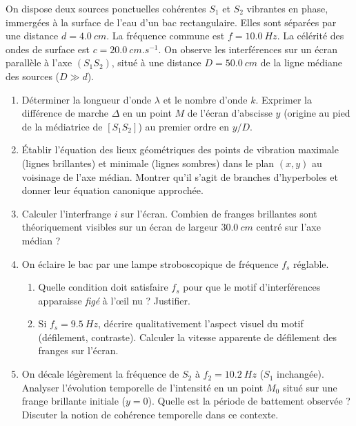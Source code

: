 \documentclass[11pt]{article}
\begin{document}
\begin{exercice}
On dispose deux sources ponctuelles cohérentes $S_1$ et $S_2$ vibrantes en phase, immergées à la surface de l'eau d'un bac rectangulaire. Elles sont séparées par une distance $d = \SI{4,0}{cm}$. La fréquence commune est $f = \SI{10,0}{Hz}$. La célérité des ondes de surface est $c = \SI{20,0}{cm.s^{-1}}$. On observe les interférences sur un écran parallèle à l'axe $(S_1S_2)$, situé à une distance $D = \SI{50,0}{cm}$ de la ligne médiane des sources ($D \gg d$).
\begin{enumerate}
    \item Déterminer la longueur d'onde $\lambda$ et le nombre d'onde $k$. Exprimer la différence de marche $\Delta$ en un point $M$ de l'écran d'abscisse $y$ (origine au pied de la médiatrice de $[S_1S_2]$) au premier ordre en $y/D$.
    \item Établir l'équation des lieux géométriques des points de vibration maximale (lignes brillantes) et minimale (lignes sombres) dans le plan $(x,y)$ au voisinage de l'axe médian. Montrer qu'il s'agit de branches d'hyperboles et donner leur équation canonique approchée.
    \item Calculer l'interfrange $i$ sur l'écran. Combien de franges brillantes sont théoriquement visibles sur un écran de largeur $\SI{30,0}{cm}$ centré sur l'axe médian ?
    \item On éclaire le bac par une lampe stroboscopique de fréquence $f_s$ réglable. 
    \begin{enumerate}
        \item Quelle condition doit satisfaire $f_s$ pour que le motif d'interférences apparaisse \textit{figé} à l'œil nu ? Justifier.
        \item Si $f_s = \SI{9,5}{Hz}$, décrire qualitativement l'aspect visuel du motif (défilement, contraste). Calculer la vitesse apparente de défilement des franges sur l'écran.
    \end{enumerate}
    \item On décale légèrement la fréquence de $S_2$ à $f_2 = \SI{10,2}{Hz}$ ($S_1$ inchangée). Analyser l'évolution temporelle de l'intensité en un point $M_0$ situé sur une frange brillante initiale ($y=0$). Quelle est la période de battement observée ? Discuter la notion de cohérence temporelle dans ce contexte.
\end{enumerate}
\end{exercice}
\end{document}

